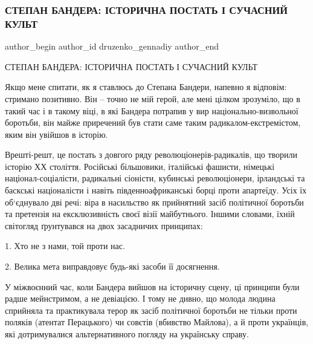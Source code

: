  
 
 
 
 
 
\subsubsection{СТЕПАН БАНДЕРА: ІСТОРИЧНА ПОСТАТЬ І СУЧАСНИЙ КУЛЬТ}
\label{sec:02_01_2022.fb.druzenko_gennadiy.1.bandera}
 
\ifcmt
 author_begin
   author_id druzenko_gennadiy
 author_end
\fi

СТЕПАН БАНДЕРА: ІСТОРИЧНА ПОСТАТЬ І СУЧАСНИЙ КУЛЬТ

Якщо мене спитати, як я ставлюсь до Степана Бандери, напевно я відповім:
стримано позитивно. Він – точно не мій герой, але мені цілком зрозуміло, що в
такий час і в такому віці, в які Бандера потрапив у вир національно-визвольної
боротьби, він майже приречений був стати саме таким радикалом-екстремістом,
яким він увійшов в історію. 


Врешті-решт, це постать з довгого ряду революціонерів-радикалів, що творили
історію ХХ століття. Російські більшовики, італійські фашисти, німецькі
націонал-соціалісти, радикальні сіоністи, кубинські революціонери, ірландські
та баскські націоналісти і навіть південноафриканські борці проти апартеїду.
Усіх їх об‘єднувало дві речі: віра в насильство як прийнятний засіб політичної
боротьби та претензія на ексклюзивність своєї візії  майбутнього. Іншими
словами, їхній світогляд ґрунтувався на двох засадничих  принципах:

1. Хто не з нами, той проти нас.

2. Велика мета виправдовує будь-які засоби її досягнення.

У міжвоєнний час, коли Бандера вийшов на історичну сцену, ці принципи були
радше мейнстримом, а не девіацією. І тому не дивно, що молода людина сприйняла
та практикувала терор як засіб політичної боротьби не тільки проти поляків
(атентат Перацького) чи совєтів (вбивство Майлова), а й проти українців, які
дотримувалися альтернативного погляду на українську справу. 

